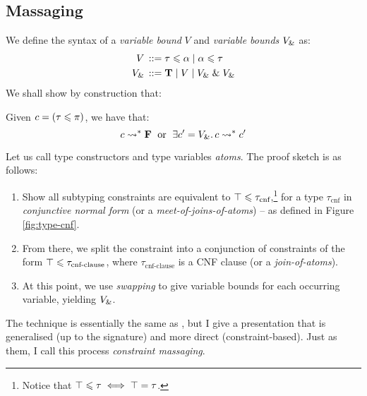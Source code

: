 \newcommand{\typcnf}{\tau_\text{cnf}}
\newcommand{\typcnfcls}{\tau_\text{cnf-clause}}
\newcommand{\typclsvars}{\tau_\text{cnf-clause-vars}}
\newcommand{\typvar}{\tau_\text{var}}
\newcommand{\vbnd}{V}
\newcommand{\vbnds}{\vbnd_{\undsym}}

\subsection{Massaging}
\label{subsec:rewriting}
We define the syntax of a \emph{variable bound} $\vbnd$ and \emph{variable bounds} $\vbnds$ as:
\begin{align*}
    \graintro \vbnd \tau \sub \alpha \mid \alpha \sub \tau \\
    \graintro {\vbnds} \tru \mid V \mid \vbnds \und \vbnds
\end{align*}
We shall show by construction that:
\begin{theorem}
    Given $c = (\tau \leqslant \pi)$, we have that:
    $$ c \step^* \fals \;\text{ or }\; \exists c' = \vbnds \ldotp c \step^* c' $$
\end{theorem}
Let us call type constructors and type variables \emph{atoms}.
The proof sketch is as follows:
\begin{enumerate}
    \item Show all subtyping constraints are equivalent to $\top \sub \typcnf$,\footnote{Notice that $\top \leqslant \tau \iff \top = \tau$.} 
    for a type $\typcnf$ in \emph{conjunctive normal form} (or a \emph{meet-of-joins-of-atoms}) -- as defined in Figure \ref{fig:type-cnf}.
    \item From there, we split the constraint into a conjunction of constraints of the form $\top \sub \typcnfcls$, where $\typcnfcls$ is a CNF clause (or a \emph{join-of-atoms}).
    \item At this point, we use \emph{swapping} to give variable bounds for each occurring variable, yielding $\vbnds$.
\end{enumerate}
The technique is essentially the same as \textcite{mlstruct}, but I give a presentation that is generalised (up to the signature) and more direct (constraint-based). Just as them, I call this process \emph{constraint massaging}. 

